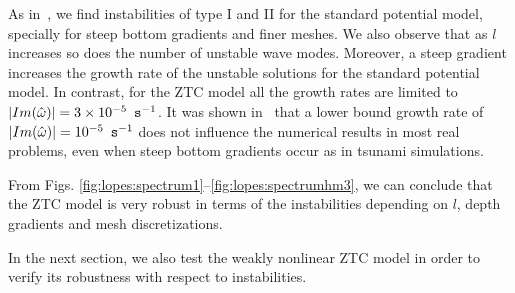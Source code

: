 As in~\cite{LovholtPedersen2009}, we find
instabilities of type I and II  for the standard
potential model, specially for steep bottom gradients and finer meshes.
We also observe that as $l$ increases so does the number of
unstable wave modes.  Moreover, a steep gradient increases the
growth rate of the unstable solutions for the standard
potential model.
In contrast, for the ZTC model  all the growth rates are
limited to $|Im(\hat\omega)|=3\times 10^{-5}\,~{\tt s}^{-1}$.
It was shown in~\cite{LovholtPedersen2009} that a
lower bound growth rate of $|Im(\hat\omega)|=10^{-5}\,~{\tt
s}^{-1}$ does not influence the numerical results in most
real problems, even when steep bottom gradients occur as in
tsunami simulations.

From
 Figs. \ref{fig:lopes:spectrum1}--\ref{fig:lopes:spectrumhm3},
 we can conclude that the ZTC model is very robust in terms
 of the instabilities depending on $l$, depth gradients and
 mesh discretizations.

In the next section, we  also test the weakly nonlinear ZTC
model in order to verify its robustness with respect to instabilities.


